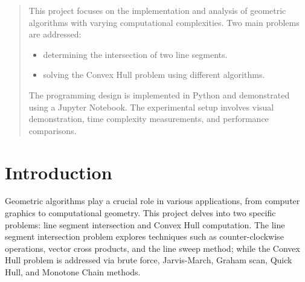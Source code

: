 \documentclass[a4paper, 10pt, twocolumn]{article}
\begin{document}
\onecolumn
\begin{abstract}
This project focuses on the implementation and analysis of geometric algorithms with varying computational complexities. 
Two main problems are addressed:
\begin{itemize}
    \item determining the intersection of two line segments.
    \item solving the Convex Hull problem using different algorithms.
\end{itemize}
The programming design is implemented in Python and demonstrated using a Jupyter Notebook. 
The experimental setup involves visual demonstration, time complexity measurements, and performance comparisons.
\end{abstract}

\vspace{1.5cm}
\tableofcontents

\twocolumn
\section{Introduction}
Geometric algorithms play a crucial role in various applications, from computer graphics to computational geometry. 
This project delves into two specific problems: line segment intersection and Convex Hull computation. 
The line segment intersection problem explores techniques such as counter-clockwise operations, vector cross products, and the line sweep method; 
while the Convex Hull problem is addressed via brute force, Jarvis-March, Graham scan, Quick Hull, and Monotone Chain methods.

\end{document}
